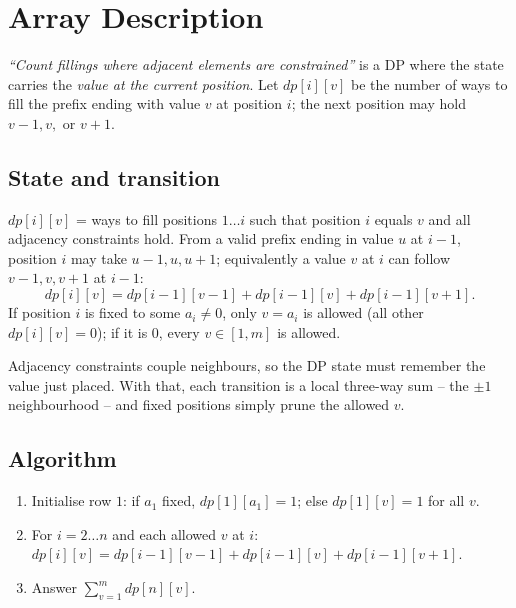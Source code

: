 \section{Array Description}
\label{sec:cses-array-description}


\begin{patternbox}
\emph{``Count fillings where adjacent elements are constrained''} is a DP
where the state carries the \emph{value at the current position}. Let
$\textit{dp}[i][v]$ be the number of ways to fill the prefix ending with
value $v$ at position $i$; the next position may hold $v-1,v,$ or $v+1$.
\end{patternbox}

\subsection*{State and transition}

$\textit{dp}[i][v]$ = ways to fill positions $1\ldots i$ such that
position $i$ equals $v$ and all adjacency constraints hold. From a valid
prefix ending in value $u$ at $i-1$, position $i$ may take
$u-1,u,u+1$; equivalently a value $v$ at $i$ can follow $v-1,v,v+1$ at
$i-1$:
\[
  \textit{dp}[i][v]=\textit{dp}[i-1][v-1]+\textit{dp}[i-1][v]+
  \textit{dp}[i-1][v+1].
\]
If position $i$ is fixed to some $a_i\ne0$, only $v=a_i$ is allowed (all
other $\textit{dp}[i][v]=0$); if it is $0$, every $v\in[1,m]$ is allowed.

\begin{ideabox}
Adjacency constraints couple neighbours, so the DP state must remember the
value just placed. With that, each transition is a local three-way sum --
the $\pm1$ neighbourhood -- and fixed positions simply prune the allowed
$v$.
\end{ideabox}

\subsection*{Algorithm}

\begin{enumerate}
  \item Initialise row $1$: if $a_1$ fixed, $\textit{dp}[1][a_1]=1$;
        else $\textit{dp}[1][v]=1$ for all $v$.
  \item For $i=2\ldots n$ and each allowed $v$ at $i$:
        $\textit{dp}[i][v]=\textit{dp}[i-1][v-1]+\textit{dp}[i-1][v]+
        \textit{dp}[i-1][v+1]$.
  \item Answer $\sum_{v=1}^{m}\textit{dp}[n][v]$.
\end{enumerate}

